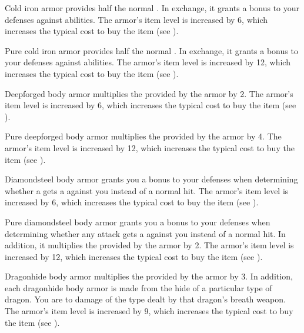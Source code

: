          Cold iron armor provides half the normal .
        In exchange, it grants a  bonus to your defenses against  abilities.
        The armor's item level is increased by 6, which increases the typical cost to buy the item (see ).

         Pure cold iron armor provides half the normal .
        In exchange, it grants a  bonus to your defenses against  abilities.
        The armor's item level is increased by 12, which increases the typical cost to buy the item (see ).

         Deepforged body armor multiplies the  provided by the armor by 2.
        The armor's item level is increased by 6, which increases the typical cost to buy the item (see ).

         Pure deepforged body armor multiplies the  provided by the armor by 4.
        The armor's item level is increased by 12, which increases the typical cost to buy the item (see ).

         Diamondsteel body armor grants you a  bonus to your defenses when determining whether a  gets a  against you instead of a normal hit.
        The armor's item level is increased by 6, which increases the typical cost to buy the item (see ).

         Pure diamondsteel body armor grants you a  bonus to your defenses when determining whether any attack gets a  against you instead of a normal hit.
        In addition, it multiplies the  provided by the armor by 2.
        The armor's item level is increased by 12, which increases the typical cost to buy the item (see ).

         Dragonhide body armor multiplies the  provided by the armor by 3.
        In addition, each dragonhide body armor is made from the hide of a particular type of dragon.
        You are  to damage of the type dealt by that dragon's breath weapon.
        The armor's item level is increased by 9, which increases the typical cost to buy the item (see ).

